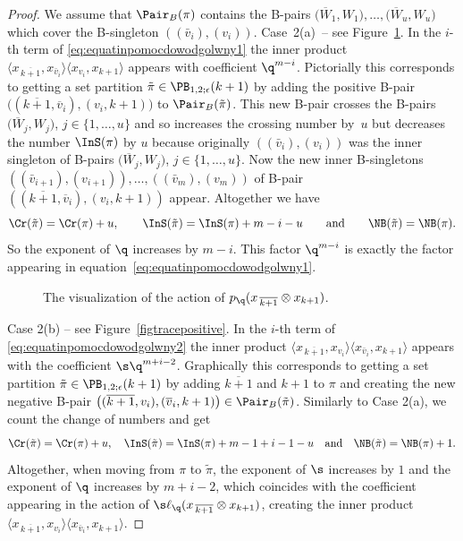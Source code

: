 \begin{proof}
We assume that $\Pair_B(\pi)$ contains the B-pairs $\big(\overline{ W}_1 , W_1\big),\dots, \big(\overline{ W}_u , W_u\big)$ which cover the B-singleton $((\bar v_i),( v_i))$.
Case~2(a)~-- see Figure~\ref{figtracepositivea}.
In the $i$-th term of \eqref{eq:equatinpomocdowodgolwny1} the inner product $\langle x_{\,\overline{k+1}},x_{\bar v_i}\rangle \langle x_{v_i} ,x_{k+1}\rangle$ appears with coefficient $\q^{m-i}$. Pictorially this corresponds to getting a set partition $\tilde{\pi} \in \PB_{1,2;\epsilon}(k+1)$ by adding the positive B-pair $\big((\overline{k+1}, \overline{v}_i) , (v_i, k+1)\big)$ to $\Pair_B(\tilde \pi)$. This new B-pair crosses the B-pairs $\big(\overline{W}_j , W_j\big)$, $j\in\{1,\dots,u\}$ and so increases the crossing number by~$u$ but decreases the number $\InS(\pi)$ by $u$ because originally $((\bar v_i),( v_i))$ was the inner singleton of B-pairs $\big(\overline{W}_j , W_j\big)$, $j\in\{1,\dots,u\}$.
Now the new inner B-singletons $((\bar v_{i+1}), (v_{i+1})), \dots,(( \bar v_m), (v_m))$ of B-pair $((\overline{k+1}, \overline{v}_i) , (v_i, k+1))$
appear.
Altogether we have
\[
\Cr(\tilde{\pi})=\Cr(\pi)+u, \qquad
\InS(\tilde{\pi})=\InS(\pi)+m-i-u\qquad \text{and}\qquad
\NB(\tilde{\pi})=\NB(\pi).
\]
So the exponent of $\q$ increases by $m-i$. This factor $\q^{m-i}$ is exactly the factor appearing in equation~\eqref{eq:equatinpomocdowodgolwny1}.

\begin{figure}[h]
\centering
{}
\caption{The visualization of the action of $p_\q(x_{\,\overline{k+1}}\otimes x_{k+1})$.}
\label{figtracepositivea}
\end{figure}

Case 2(b) -- see Figure~\ref{figtracepositive}.
In the $i$-th term of \eqref{eq:equatinpomocdowodgolwny2} the inner product $\langle x_{\,\overline{k+1}},x_{ v_i}\rangle \langle x_{\bar v_i} ,x_{k+1}\rangle$ appears with the coefficient $\s \q^{m+ i-2}$.
Graphically this
corresponds to getting a set partition $\tilde{\pi} \in \PB_{1,2;\epsilon}(k+1)$ by adding $\overline{k + 1}$ and $k + 1$ to $\pi$ and creating the new negative B-pair $\big((\overline{k+1}, v_{i}) , (\overline v_ i, k+1)\big)\in \Pair_B(\tilde \pi)$.
Similarly to Case 2(a), we count the change of numbers and get
\[
\Cr(\tilde{\pi})=\Cr(\pi)+u,\quad
\InS(\tilde{\pi})=\InS(\pi)+m-1+i-1-u\quad\text{and}\quad \NB(\tilde{\pi})=\NB(\pi)+1.
\]
Altogether, when moving from $\pi$ to $\tilde{\pi}$, the exponent of $\s$ increases by $1$ and the exponent of $\q$ increases by ${m+ i-2}$, which coincides with the coefficient appearing in the action of $\s \ell_{\q}(x_{\,\overline{k+1}}\otimes x_{k+1})$, creating the inner product $\langle x_{\,\overline{k+1}},x_{ v_i}\rangle \langle x_{\bar v_i}, x_{k+1}\rangle$.


\end{proof}
